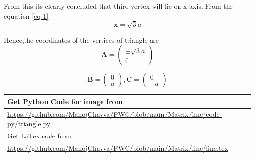 \documentclass[journal,12pt,twocolumn]{IEEEtran}
\let\vec\mathbf
\begin{document}
\noindent From this its clearly concluded that third vertex will lie on x-axis. 
\noindent From the equation \eqref{eq-1} 
\begin{equation}
\vec{x} = \sqrt{3}{a}
\end{equation}


\noindent Hence,the coordinates of the vertices of triangle are 
  \begin{equation*}
\vec{A} = 
   \begin{pmatrix}
   \pm\sqrt{3}a \\ 0
 \end{pmatrix}
 \end{equation*}

\begin{equation}
\vec{B}=\begin{pmatrix} 
0\\
a
\end{pmatrix}, {
\vec{C}=\begin{pmatrix} 
0\\
-a
\end{pmatrix} }
\end{equation}




\begin{table}[h]
\large
\begin{tabular}{lll}
\multicolumn{3}{l}{Get Python Code for image from}                                                 \\ \hline
\multicolumn{3}{|l|}{\url{https://github.com/ManojChavva/FWC/blob/main/Matrix/line/code-py/triangle.py}} \\ 
 \hline
\multicolumn{3}{l}{Get LaTex code from}                                                            \\ \hline
\multicolumn{3}{|l|}{\url{https://github.com/ManojChavva/FWC/blob/main/Matrix/line/line.tex}}            \\ \hline
\end{tabular}
\end{table}
\end{document}
